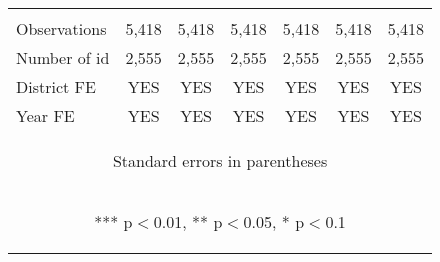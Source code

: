 \begin{center}
\begin{tabular}{lcccccc}
\vspace{4pt} & \begin{footnotesize}\end{footnotesize} & \begin{footnotesize}\end{footnotesize} & \begin{footnotesize}\end{footnotesize} & \begin{footnotesize}\end{footnotesize} & \begin{footnotesize}\end{footnotesize} & \begin{footnotesize}\end{footnotesize} \\
Observations & 5,418 & 5,418 & 5,418 & 5,418 & 5,418 & 5,418 \\
Number of id & 2,555 & 2,555 & 2,555 & 2,555 & 2,555 & 2,555 \\
District FE & YES & YES & YES & YES & YES & YES \\
 Year FE & YES & YES & YES & YES & YES & YES \\ \hline
\multicolumn{7}{c}{\begin{footnotesize} Standard errors in parentheses\end{footnotesize}} \\
\multicolumn{7}{c}{\begin{footnotesize} *** p$<$0.01, ** p$<$0.05, * p$<$0.1\end{footnotesize}} \\
\end{tabular}
\end{center}
